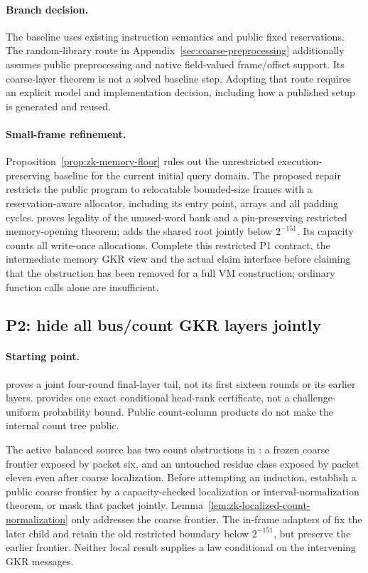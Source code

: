 \paragraph{Branch decision.} The baseline uses existing instruction semantics and public fixed reservations. The random-library route in Appendix~\ref{sec:coarse-preprocessing} additionally assumes public preprocessing and native field-valued frame/offset support. Its coarse-layer theorem is not a solved baseline step. Adopting that route requires an explicit model and implementation decision, including how a published setup is generated and reused.

\paragraph{Small-frame refinement.} Proposition~\ref{prop:zk-memory-floor} rules out the unrestricted execution-preserving baseline for the current initial query domain. The proposed repair restricts the public program to relocatable bounded-size frames with a reservation-aware allocator, including its entry point, arrays and all padding cycles.  proves legality of the unused-word bank and a pin-preserving restricted memory-opening theorem;  adds the shared root jointly below $2^{-151}$. Its capacity counts all write-once allocations. Complete this restricted P1 contract, the intermediate memory GKR view and the actual claim interface before claiming that the obstruction has been removed for a full VM construction; ordinary function calls alone are insufficient.

\subsection{P2: hide all bus/count GKR layers jointly}

\paragraph{Starting point.}  proves a joint four-round final-layer tail, not its first sixteen rounds or its earlier layers.  provides one exact conditional head-rank certificate, not a challenge-uniform probability bound. Public count-column products do not make the internal count tree public.

The active balanced source has two count obstructions in : a frozen coarse frontier exposed by packet six, and an untouched residue class exposed by packet eleven even after coarse localization. Before attempting an induction, establish a public coarse frontier by a capacity-checked localization or interval-normalization theorem, or mask that packet jointly. Lemma~\ref{lem:zk-localized-count-normalization} only addresses the coarse frontier. The in-frame adapters of  fix the later child and retain the old restricted boundary below $2^{-151}$, but preserve the earlier frontier. Neither local result supplies a law conditional on the intervening GKR messages.

